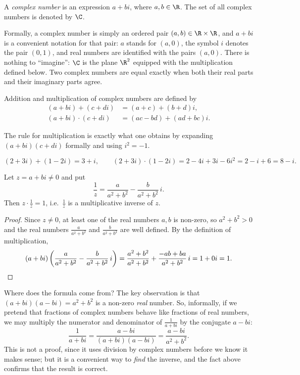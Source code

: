 \begin{definition}
A \emph{complex number} is an expression $a+bi$, where $a,b\in \R$. The set of all complex numbers is denoted
by $\C$.
\end{definition}

\begin{remark}
Formally, a complex number is simply an ordered pair $(a,b)\in\R\times\R$, and $a+bi$ is a convenient
notation for that pair: $a$ stands for $(a,0)$, the symbol $i$ denotes the pair $(0,1)$, and real numbers
are identified with the pairs $(a,0)$. There is nothing to ``imagine'': $\C$ is the plane $\R^2$ equipped
with the multiplication defined below. Two complex numbers are equal exactly when both their real parts and
their imaginary parts agree.
\end{remark}

\begin{definition}
Addition and multiplication of complex numbers are defined by
\[
\begin{aligned}
(a+bi)+(c+di) &= (a+c) + (b+d)i,\\
(a+bi)\cdot(c+di) &= (ac-bd)+ (ad+bc)i.
\end{aligned}
\]
\end{definition}

\noindent The rule for multiplication is exactly what one obtains by expanding $(a+bi)(c+di)$ formally and
using $i^2=-1$.

\begin{example}
\[
(2+3i)+(1-2i) = 3+i, \qquad
(2+3i)\cdot(1-2i) = 2-4i+3i-6i^2 = 2-i+6 = 8-i.
\]
\end{example}

\begin{fact}[Inversion]
Let $z=a+bi\neq 0$ and put
\[
\frac{1}{z} = \frac{a}{a^2+b^2}-\frac{b}{a^2+b^2}\,i.
\]
Then $z\cdot\frac1z = 1$, i.e.\ $\frac1z$ is a multiplicative inverse of $z$.
\end{fact}

\begin{proof}
Since $z\neq 0$, at least one of the real numbers $a,b$ is non-zero, so $a^2+b^2>0$ and the real numbers
$\frac{a}{a^2+b^2}$ and $\frac{b}{a^2+b^2}$ are well defined. By the definition of multiplication,
\[
(a+bi)\left(\frac{a}{a^2+b^2}-\frac{b}{a^2+b^2}\,i\right)
= \frac{a^2+b^2}{a^2+b^2} + \frac{-ab+ba}{a^2+b^2}\,i = 1+0i = 1. \qedhere
\]
\end{proof}

\begin{remark}
Where does the formula come from? The key observation is that $(a+bi)(a-bi)=a^2+b^2$ is a non-zero
\emph{real} number. So, informally, if we pretend that fractions of complex numbers behave like fractions of
real numbers, we may multiply the numerator and denominator of $\frac{1}{a+bi}$ by the conjugate $a-bi$:
\[
\frac{1}{a+bi} =\frac{a-bi}{(a+bi)(a-bi)} = \frac{a-bi}{a^2+b^2}.
\]
This is not a proof, since it uses division by complex numbers before we know it makes sense; but it is a
convenient way to \emph{find} the inverse, and the fact above confirms that the result is correct.
\end{remark}

